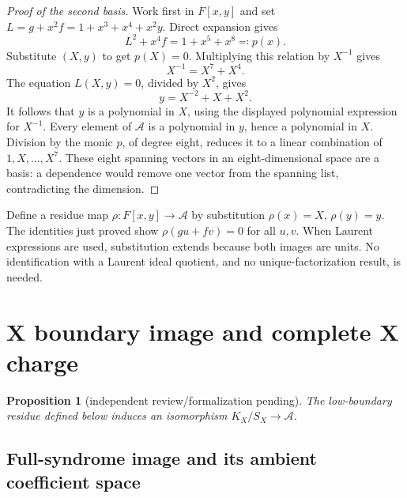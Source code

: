 \documentclass{article}
\newtheorem{proposition}{Proposition}
\begin{document}
\begin{proof}[Proof of the second basis]
  Work first in \(F[x,y]\) and set \(L = g + x^2 f = 1 + x^3 + x^4 + x^2 y\). Direct
  expansion gives
  \begin{equation}
    L^2 + x^4 f = 1 + x^5 + x^8 \eqqcolon p(x).
  \end{equation}
  Substitute \((X,y)\) to get \(p(X) = 0\). Multiplying this relation by \(X^{-1}\) gives
  \begin{equation}
    X^{-1} = X^7 + X^4.
  \end{equation}
  The equation \(L(X,y) = 0\), divided by \(X^2\), gives
  \begin{equation}
    y = X^{-2} + X + X^2.
  \end{equation}
  It follows that \(y\) is a polynomial in \(X\), using the displayed polynomial expression
  for \(X^{-1}\). Every element of \(\mathcal{A}\) is a polynomial in \(y\), hence a
  polynomial in \(X\). Division by the monic \(p\), of degree eight, reduces it to a linear
  combination of \(1, X, \dots, X^7\). These eight spanning vectors in an eight-dimensional
  space are a basis: a dependence would remove one vector from the spanning list,
  contradicting the dimension.
\end{proof}

Define a residue map \(\rho \colon F[x,y] \to \mathcal{A}\) by substitution
\(\rho(x) = X\), \(\rho(y) = y\). The identities just proved show \(\rho(gu + fv) = 0\) for
all \(u, v\). When Laurent expressions are used, substitution extends because both images
are units. No identification with a Laurent ideal quotient, and no unique-factorization
result, is needed.

\section{X boundary image and complete X charge}\label{sec:x-charge}

\begin{proposition}[independent review\slash formalization pending]\label{prop:x-charge}
  The low-boundary residue defined below induces an isomorphism
  \(K_X/S_X \to \mathcal{A}\).
\end{proposition}

\subsection{Full-syndrome image and its ambient coefficient space}\label{sec:x-image}
\end{document}
